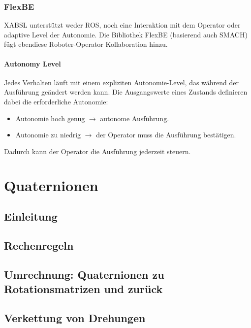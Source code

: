 \documentclass[a4paper, 11pt, accentcolor = tud3b]{tudreport}
\begin{document}
			\subsection{FlexBE}
				XABSL unterstützt weder ROS, noch eine Interaktion mit dem Operator oder adaptive Level der Autonomie. Die Bibliothek FlexBE (basierend auch SMACH) fügt ebendiese Roboter-Operator Kollaboration hinzu.

				\subsubsection{Autonomy Level}
					Jedes Verhalten läuft mit einem expliziten Autonomie-Level, das während der Ausführung geändert werden kann. Die Ausgangswerte eines Zustands definieren dabei die erforderliche Autonomie:
					\begin{itemize}
						\item Autonomie hoch genug \(\to\) autonome Ausführung.
						\item Autonomie zu niedrig \(\to\) der Operator muss die Ausführung bestätigen.
					\end{itemize}
					Dadurch kann der Operator die Ausführung jederzeit steuern.





	\appendix

	\chapter{Quaternionen} %

		\section{Einleitung} %

		\section{Rechenregeln} %

		\section{Umrechnung: Quaternionen zu Rotationsmatrizen und zurück} %

		\section{Verkettung von Drehungen} %
\end{document}
